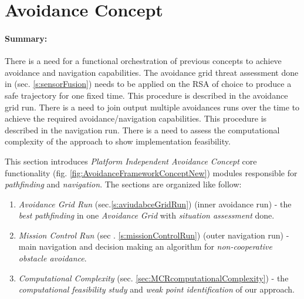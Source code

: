 \cleardoublepage
\section{Avoidance Concept}\label{s:avoidanceConcept}

\paragraph{Summary:} There is a need for a functional orchestration of previous concepts to achieve avoidance and navigation capabilities. The avoidance grid threat assessment done in (sec. \ref{s:sensorFusion}) needs to be applied on the RSA of choice to produce a safe trajectory for one fixed time. This procedure is described in the avoidance grid run. There is a need to join output multiple avoidances runs over the time to achieve the required avoidance/navigation capabilities.  This procedure is described in the navigation run. There is a need to assess the computational complexity of the approach to show implementation feasibility. 


This section introduces \emph{Platform Independent Avoidance Concept} core functionality (fig. \ref{fig:AvoidanceFrameworkConceptNew}) modules responsible for \emph{pathfinding} and \emph{navigation}. The sections are organized like follow:

\begin{enumerate}
    
    \item \emph{Avoidance Grid Run} (sec.\ref{s:aviudabceGridRun}) (inner avoidance run) - the \emph{best pathfinding} in one \emph{Avoidance Grid} with \emph{situation assessment} done.
    
    \item \emph{Mission Control Run} (sec . \ref{s:missionControlRun}) (outer navigation run) - main navigation and decision making an algorithm for \emph{non-cooperative obstacle avoidance}.
    
    \item \emph{Computational Complexity} (sec. \ref{sec:MCRcomputationalComplexity}) - the \emph{computational feasibility study} and \emph{weak point identification} of our approach.
    
\end{enumerate}
